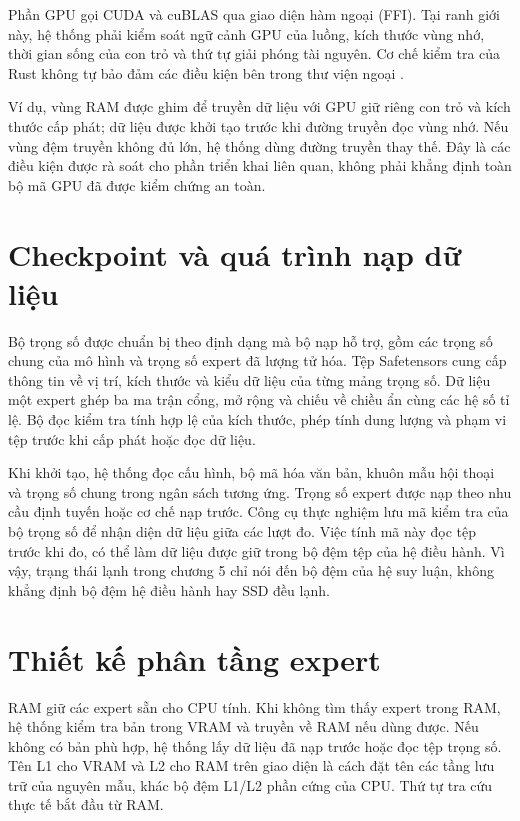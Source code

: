 Phần GPU gọi CUDA và cuBLAS qua giao diện hàm ngoại (FFI). Tại ranh giới này, hệ thống phải kiểm soát ngữ cảnh GPU của luồng, kích thước vùng nhớ, thời gian sống của con trỏ và thứ tự giải phóng tài nguyên. Cơ chế kiểm tra của Rust không tự bảo đảm các điều kiện bên trong thư viện ngoại \cite{moe_tierengine_arch}.

Ví dụ, vùng RAM được ghim để truyền dữ liệu với GPU giữ riêng con trỏ và kích thước cấp phát; dữ liệu được khởi tạo trước khi đường truyền đọc vùng nhớ. Nếu vùng đệm truyền không đủ lớn, hệ thống dùng đường truyền thay thế. Đây là các điều kiện được rà soát cho phần triển khai liên quan, không phải khẳng định toàn bộ mã GPU đã được kiểm chứng an toàn.

\section{Checkpoint và quá trình nạp dữ liệu}

Bộ trọng số được chuẩn bị theo định dạng mà bộ nạp hỗ trợ, gồm các trọng số chung của mô hình và trọng số expert đã lượng tử hóa. Tệp Safetensors cung cấp thông tin về vị trí, kích thước và kiểu dữ liệu của từng mảng trọng số. Dữ liệu một expert ghép ba ma trận cổng, mở rộng và chiếu về chiều ẩn cùng các hệ số tỉ lệ. Bộ đọc kiểm tra tính hợp lệ của kích thước, phép tính dung lượng và phạm vi tệp trước khi cấp phát hoặc đọc dữ liệu.

Khi khởi tạo, hệ thống đọc cấu hình, bộ mã hóa văn bản, khuôn mẫu hội thoại và trọng số chung trong ngân sách tương ứng. Trọng số expert được nạp theo nhu cầu định tuyến hoặc cơ chế nạp trước. Công cụ thực nghiệm lưu mã kiểm tra của bộ trọng số để nhận diện dữ liệu giữa các lượt đo. Việc tính mã này đọc tệp trước khi đo, có thể làm dữ liệu được giữ trong bộ đệm tệp của hệ điều hành. Vì vậy, trạng thái lạnh trong chương 5 chỉ nói đến bộ đệm của hệ suy luận, không khẳng định bộ đệm hệ điều hành hay SSD đều lạnh.

\section{Thiết kế phân tầng expert}

RAM giữ các expert sẵn cho CPU tính. Khi không tìm thấy expert trong RAM, hệ thống kiểm tra bản trong VRAM và truyền về RAM nếu dùng được. Nếu không có bản phù hợp, hệ thống lấy dữ liệu đã nạp trước hoặc đọc tệp trọng số. Tên L1 cho VRAM và L2 cho RAM trên giao diện là cách đặt tên các tầng lưu trữ của nguyên mẫu, khác bộ đệm L1/L2 phần cứng của CPU. Thứ tự tra cứu thực tế bắt đầu từ RAM.


